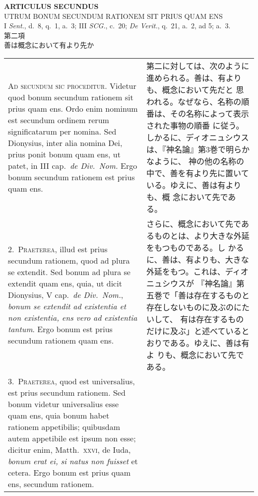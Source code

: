\documentclass[10pt]{jsarticle} %
\begin{document}
\newpage
{}

\begin{center}
 {\Large {\bf ARTICULUS SECUNDUS}}\\
 {\large UTRUM BONUM SECUNDUM RATIONEM SIT PRIUS QUAM ENS}\\
 {\footnotesize I {\itshape Sent.}, d.~8, q.~1, a.~3; III {\itshape
 SCG.}, c.~20; {\itshape De Verit.}, q.~21, a.~2, ad 5; a.~3.}\\
 {\Large 第二項\\善は概念において有より先か}
\end{center}

\begin{longtable}{p{21em}p{21em}}


{\huge A}{\scshape d secundum sic proceditur}. Videtur quod bonum
 secundum rationem sit prius quam ens. Ordo enim nominum est secundum
 ordinem rerum significatarum per nomina. Sed Dionysius, inter alia
 nomina Dei, prius ponit bonum quam ens, ut patet, in III cap.~{\itshape de
 Div.~Nom.} Ergo bonum secundum rationem est prius quam ens.

&
第二に対しては、次のように進められる。善は、有よりも、概念において先だと
 思われる。なぜなら、名称の順番は、その名称によって表示された事物の順番
 に従う。しかるに、ディオニュシウスは、『神名論』第3巻で明らかなように、
 神の他の名称の中で、善を有より先に置いている。ゆえに、善は有よりも、概
 念において先である。

\\



2.~{\scshape Praeterea}, illud est prius secundum rationem, quod ad
 plura se extendit. Sed bonum ad plura se extendit quam ens, quia, ut
 dicit Dionysius, V cap.~{\itshape de Div.~Nom.}, {\itshape bonum se
 extendit ad existentia et non existentia, ens vero ad existentia
 tantum}. Ergo bonum est prius secundum rationem quam ens.

&

さらに、概念において先であるものとは、より大きな外延をもつものである。し
 かるに、善は、有よりも、大きな外延をもつ。これは、ディオニュシウスが
 『神名論』第五巻で「善は存在するものと存在しないものに及ぶのにたいして、
 有は存在するものだけに及ぶ」と述べているとおりである。ゆえに、善は有よ
 りも、概念において先である。

\\


3.~{\scshape Praeterea}, quod est universalius, est prius secundum
 rationem. Sed bonum videtur universalius esse quam ens, quia bonum
 habet rationem appetibilis; quibusdam autem appetibile est ipsum non
 esse; dicitur enim, Matth.~{\scshape xxvi}, de Iuda, {\itshape bonum
 erat ei, si natus non fuisset} et cetera. Ergo bonum est prius quam
 ens, secundum rationem.


\end{longtable}
\end{document}
